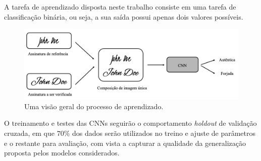 

A tarefa de aprendizado disposta neste trabalho consiste em uma tarefa de classificação binária, ou seja, a sua saída possui apenas dois valores possíveis.


\begin{figure}[h!]
\centering
\caption{Uma visão geral do processo de aprendizado.}
\label{fig:esquema-solucao}
\includegraphics[width=\textwidth]{imgs/esquema-solucao}
\end{figure}

O treinamento e testes das CNNs seguirão o comportamento \emph{holdout} de validação
cruzada, em que $70\%$ dos dados serão utilizados no treino e ajuste de parâmetros e o
restante para avaliação, com vista a capturar a qualidade da generalização proposta pelos
modelos considerados.
